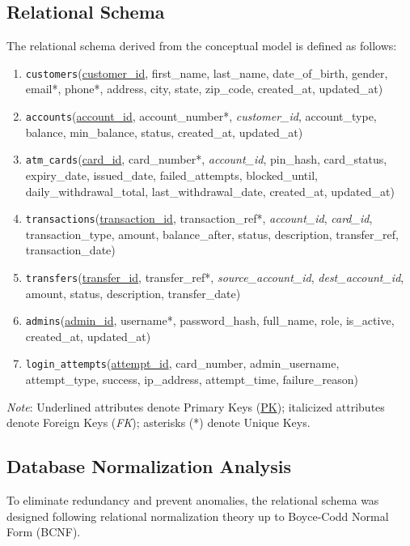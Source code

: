 \documentclass[11pt,a4paper]{report}
\begin{document}
\subsection{Relational Schema}
The relational schema derived from the conceptual model is defined as follows:
\begin{enumerate}
    \item \texttt{customers}(\underline{customer\_id}, first\_name, last\_name, date\_of\_birth, gender, email*, phone*, address, city, state, zip\_code, created\_at, updated\_at)
    \item \texttt{accounts}(\underline{account\_id}, account\_number*, \textit{customer\_id}, account\_type, balance, min\_balance, status, created\_at, updated\_at)
    \item \texttt{atm\_cards}(\underline{card\_id}, card\_number*, \textit{account\_id}, pin\_hash, card\_status, expiry\_date, issued\_date, failed\_attempts, blocked\_until, daily\_withdrawal\_total, last\_withdrawal\_date, created\_at, updated\_at)
    \item \texttt{transactions}(\underline{transaction\_id}, transaction\_ref*, \textit{account\_id}, \textit{card\_id}, transaction\_type, amount, balance\_after, status, description, transfer\_ref, transaction\_date)
    \item \texttt{transfers}(\underline{transfer\_id}, transfer\_ref*, \textit{source\_account\_id}, \textit{dest\_account\_id}, amount, status, description, transfer\_date)
    \item \texttt{admins}(\underline{admin\_id}, username*, password\_hash, full\_name, role, is\_active, created\_at, updated\_at)
    \item \texttt{login\_attempts}(\underline{attempt\_id}, card\_number, admin\_username, attempt\_type, success, ip\_address, attempt\_time, failure\_reason)
\end{enumerate}
\textit{Note}: Underlined attributes denote Primary Keys (\underline{PK}); italicized attributes denote Foreign Keys (\textit{FK}); asterisks (*) denote Unique Keys.

\subsection{Database Normalization Analysis}
To eliminate redundancy and prevent anomalies, the relational schema was designed following relational normalization theory up to Boyce-Codd Normal Form (BCNF).
\end{document}
